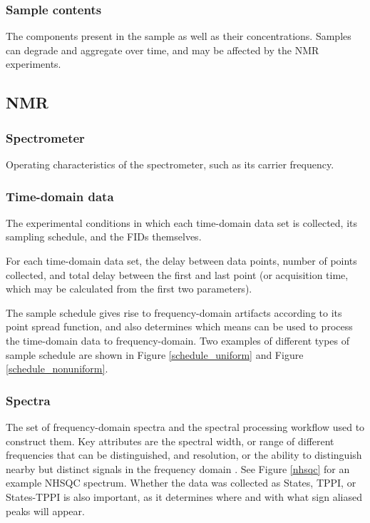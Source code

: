 \subsubsection{Sample contents}
The components present in the sample as well as their concentrations.
Samples can degrade and aggregate over time, and may be affected by the
NMR experiments.

\subsection{NMR}

\subsubsection{Spectrometer}
Operating characteristics of the spectrometer, such as its carrier frequency.

\subsubsection{Time-domain data}
The experimental conditions in which each time-domain data set is collected, 
its sampling schedule, and the FIDs themselves.

For each time-domain data set, the delay between data points, number of 
points collected, and total delay between the first and last point (or 
acquisition time, which may be calculated from the first two parameters).

The sample schedule gives rise to frequency-domain artifacts according to 
its point spread function, and also determines which means can be used to
process the time-domain data to frequency-domain.  Two examples of different
types of sample schedule are shown in Figure \ref{schedule_uniform} and
Figure \ref{schedule_nonuniform}.

\subsubsection{Spectra}
The set of frequency-domain spectra and the spectral processing workflow
used to construct them.  Key attributes are the spectral width, or range of
different frequencies that can be distinguished, and resolution, or the
ability to distinguish nearby but distinct signals in the frequency domain
\cite{ernst2004}.  See Figure \ref{nhsqc} for an example NHSQC spectrum.
Whether the data was collected as States, TPPI, or States-TPPI is also 
important, as it determines where and with what sign aliased peaks will
appear.

